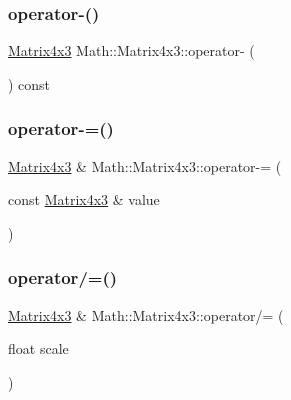 \mbox{\label{struct_math_1_1_matrix4x3_af2d9a6fc59e55d9f6614a73bc2a8d9c3}} 
\subsubsection{\texorpdfstring{operator-\/()}{operator-()}}
{\footnotesize\ttfamily \mbox{\hyperlink{struct_math_1_1_matrix4x3}{Matrix4x3}} Math\+::\+Matrix4x3\+::operator-\/ (\begin{DoxyParamCaption}{ }\end{DoxyParamCaption}) const}

\mbox{\label{struct_math_1_1_matrix4x3_ae19b8a9dd5d0504eaaa55e3e733a6902}} 
\subsubsection{\texorpdfstring{operator-\/=()}{operator-=()}}
{\footnotesize\ttfamily \mbox{\hyperlink{struct_math_1_1_matrix4x3}{Matrix4x3}} \& Math\+::\+Matrix4x3\+::operator-\/= (\begin{DoxyParamCaption}\item[{const \mbox{\hyperlink{struct_math_1_1_matrix4x3}{Matrix4x3}} \&}]{value }\end{DoxyParamCaption})}

\mbox{\label{struct_math_1_1_matrix4x3_a1e9eeddbba107f17c1a301fc0216a525}} 
\subsubsection{\texorpdfstring{operator/=()}{operator/=()}}
{\footnotesize\ttfamily \mbox{\hyperlink{struct_math_1_1_matrix4x3}{Matrix4x3}} \& Math\+::\+Matrix4x3\+::operator/= (\begin{DoxyParamCaption}\item[{float}]{scale }\end{DoxyParamCaption})}

